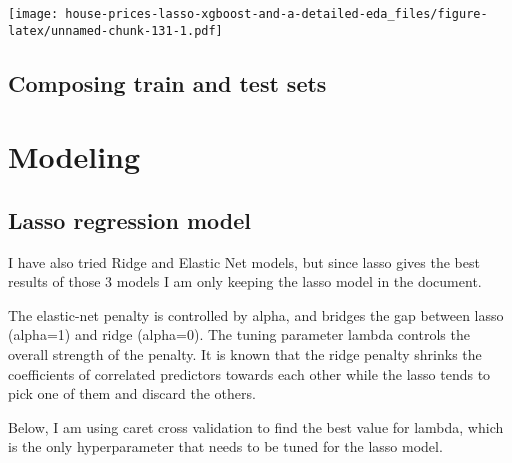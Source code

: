 \documentclass[]{article}
\newenvironment{Shaded}{\begin{snugshade}}{\end{snugshade}}
\newcommand{\KeywordTok}[1]{\textcolor[rgb]{0.13,0.29,0.53}{\textbf{#1}}}
\newcommand{\StringTok}[1]{\textcolor[rgb]{0.31,0.60,0.02}{#1}}
\newcommand{\OperatorTok}[1]{\textcolor[rgb]{0.81,0.36,0.00}{\textbf{#1}}}
\newcommand{\NormalTok}[1]{#1}
\begin{document}
\texttt{[image: house-prices-lasso-xgboost-and-a-detailed-eda\_files/figure-latex/unnamed-chunk-131-1.pdf]}

\subsection{Composing train and test
sets}\label{composing-train-and-test-sets}

\begin{Shaded}
\end{Shaded}

\section{Modeling}\label{modeling}

\subsection{Lasso regression model}\label{lasso-regression-model}

I have also tried Ridge and Elastic Net models, but since lasso gives
the best results of those 3 models I am only keeping the lasso model in
the document.

The elastic-net penalty is controlled by alpha, and bridges the gap
between lasso (alpha=1) and ridge (alpha=0). The tuning parameter lambda
controls the overall strength of the penalty. It is known that the ridge
penalty shrinks the coefficients of correlated predictors towards each
other while the lasso tends to pick one of them and discard the others.

Below, I am using caret cross validation to find the best value for
lambda, which is the only hyperparameter that needs to be tuned for the
lasso model.
\end{document}
